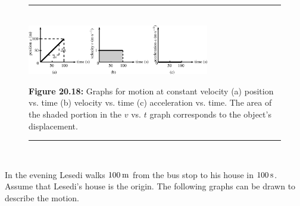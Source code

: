     \setcounter{subfigure}{0}


	\begin{figure}[H] %
    \begin{center}
    \rule[.1in]{\figurerulewidth}{.005in} \\
        \label{m38795*uid92!!!underscore!!!media}\label{m38795*uid92!!!underscore!!!printimage}\includegraphics[width=300px]{col11305.imgs/m38795_PG10C2_023.png} %
        
      \vspace{2pt}
    \vspace{\rubberspace}\par \begin{cnxcaption}
	  \small \textbf{Figure 20.18: }Graphs for motion at constant velocity (a) position vs. time (b) velocity vs. time (c) acceleration vs. time. The area of the shaded portion in the \begin{math}v\end{math} vs. \begin{math}t\end{math} graph corresponds to the object's displacement.
	\end{cnxcaption}
      
    \vspace{.1in}
    \rule[.1in]{\figurerulewidth}{.005in} \\
        
    \end{center}

 \end{figure}   

    \addtocounter{footnote}{-0}
    
        \label{m38795*id70200}In the evening Lesedi walks \begin{math}100\phantom{\rule{2pt}{0ex}}\mathrm{m}\end{math} from the bus stop to his house in \begin{math}100\phantom{\rule{2pt}{0ex}}\mathrm{s}\end{math}. Assume that Lesedi's house is the origin. The following graphs can be drawn to describe the motion.\par 
        
